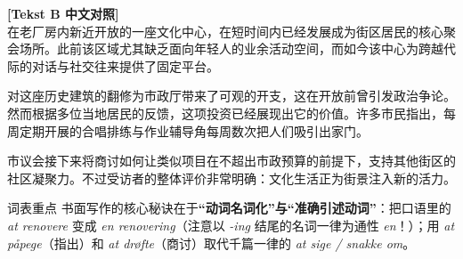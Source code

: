 \begin{transbox}
\small
\textbf{\color{NCDTeal}[Tekst B 中文对照]}\\
在老厂房内新近开放的一座文化中心，在短时间内已经发展成为街区居民的核心聚会场所。此前该区域尤其缺乏面向年轻人的业余活动空间，而如今该中心为跨越代际的对话与社交往来提供了固定平台。

对这座历史建筑的翻修为市政厅带来了可观的开支，这在开放前曾引发政治争论。然而根据多位当地居民的反馈，这项投资已经展现出它的价值。许多市民指出，每周定期开展的合唱排练与作业辅导角每周数次把人们吸引出家门。

市议会接下来将商讨如何让类似项目在不超出市政预算的前提下，支持其他街区的社区凝聚力。不过受访者的整体评价非常明确：文化生活正为街景注入新的活力。
\end{transbox}


\begin{tipbox}{词表重点}
书面写作的核心秘诀在于\textbf{“动词名词化”与“准确引述动词”}：把口语里的 \textit{at renovere} 变成 \textit{en renovering}（注意以 \textit{-ing} 结尾的名词一律为通性 \textit{en}！）；用 \textit{at påpege}（指出）和 \textit{at drøfte}（商讨）取代千篇一律的 \textit{at sige / snakke om}。
\end{tipbox}

